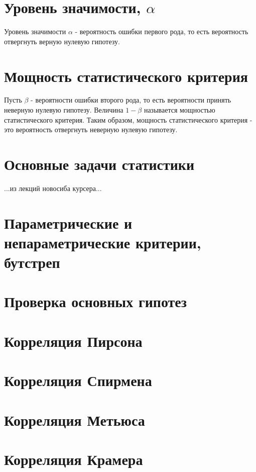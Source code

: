 \section{Уровень значимости, $\alpha$}

Уровень значимости $\alpha$ - вероятность ошибки первого рода, то есть вероятность отвергнуть верную нулевую гипотезу.


\section{Мощность статистического критерия}

Пусть $\beta$ - вероятности ошибки второго рода, то есть вероятности принять неверную нулевую гипотезу. Величина $1 - \beta$ называется мощностью статистического критерия. Таким образом, мощность статистического критерия - это вероятность отвергнуть неверную нулевую гипотезу.

\section{Основные задачи статистики}

...из лекций новосиба  курсера...


\section{Параметрические и непараметрические критерии, бутстреп}


\section{Проверка основных гипотез}


\section{Корреляция Пирсона}


\section{Корреляция Спирмена}


\section{Корреляция Метьюса}


\section{Корреляция Крамера}


